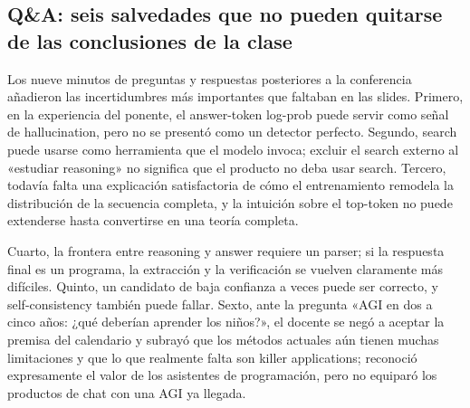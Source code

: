 \subsection{Q\&A: seis salvedades que no pueden quitarse de las conclusiones de la clase}

Los nueve minutos de preguntas y respuestas posteriores a la conferencia añadieron las incertidumbres más importantes que faltaban en las slides. Primero, en la experiencia del ponente, el answer-token log-prob puede servir como señal de hallucination, pero no se presentó como un detector perfecto. Segundo, search puede usarse como herramienta que el modelo invoca; excluir el search externo al «estudiar reasoning» no significa que el producto no deba usar search. Tercero, todavía falta una explicación satisfactoria de cómo el entrenamiento remodela la distribución de la secuencia completa, y la intuición sobre el top-token no puede extenderse hasta convertirse en una teoría completa.


Cuarto, la frontera entre reasoning y answer requiere un parser; si la respuesta final es un programa, la extracción y la verificación se vuelven claramente más difíciles. Quinto, un candidato de baja confianza a veces puede ser correcto, y self-consistency también puede fallar. Sexto, ante la pregunta «AGI en dos a cinco años: ¿qué deberían aprender los niños?», el docente se negó a aceptar la premisa del calendario y subrayó que los métodos actuales aún tienen muchas limitaciones y que lo que realmente falta son killer applications; reconoció expresamente el valor de los asistentes de programación, pero no equiparó los productos de chat con una AGI ya llegada.


